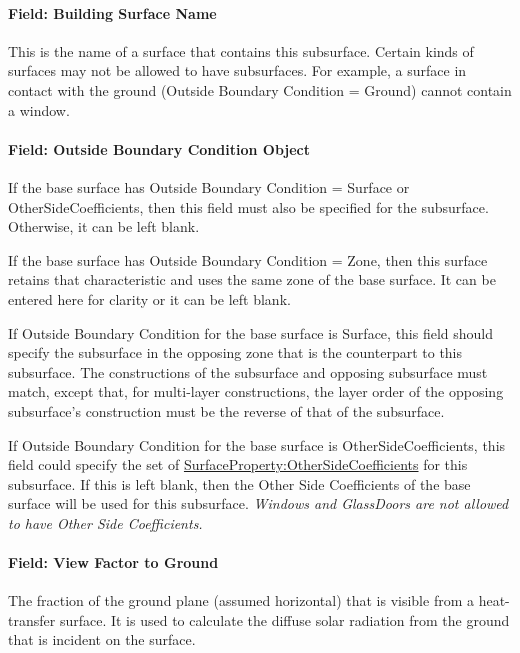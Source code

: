 \paragraph{Field: Building Surface Name}\label{field-building-surface-name-6}

This is the name of a surface that contains this subsurface. Certain kinds of surfaces may not be allowed to have subsurfaces. For example, a surface in contact with the ground (Outside Boundary Condition = Ground) cannot contain a window.

\paragraph{Field: Outside Boundary Condition Object}\label{field-outside-boundary-condition-object-10}

If the base surface has Outside Boundary Condition = Surface or OtherSideCoefficients, then this field must also be specified for the subsurface. Otherwise, it can be left blank.

If the base surface has Outside Boundary Condition = Zone, then this surface retains that characteristic and uses the same zone of the base surface. It can be entered here for clarity or it can be left blank.

If Outside Boundary Condition for the base surface is Surface, this field should specify the subsurface in the opposing zone that is the counterpart to this subsurface. The constructions of the subsurface and opposing subsurface must match, except that, for multi-layer constructions, the layer order of the opposing subsurface's construction must be the reverse of that of the subsurface.

If Outside Boundary Condition for the base surface is OtherSideCoefficients, this field could specify the set of \hyperref[surfacepropertyothersidecoefficients]{SurfaceProperty:OtherSideCoefficients} for this subsurface. If this is left blank, then the Other Side Coefficients of the base surface will be used for this subsurface. \emph{Windows and GlassDoors are not allowed to have Other Side Coefficients.}

\paragraph{Field: View Factor to Ground}\label{field-view-factor-to-ground-4}

The fraction of the ground plane (assumed horizontal) that is visible from a heat-transfer surface. It is used to calculate the diffuse solar radiation from the ground that is incident on the surface.

